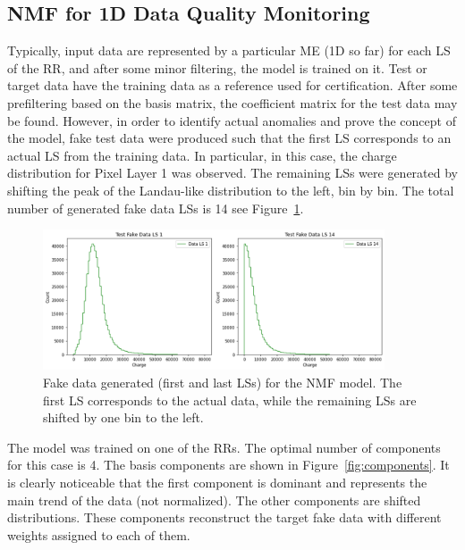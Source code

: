 \subsection{NMF for 1D Data Quality Monitoring}

Typically, input data are represented by a particular ME (1D so far) for each LS of the RR, and after some minor filtering, the model is trained on it. Test or target data have the training data as a reference used for certification. After some prefiltering based on the basis matrix, the coefficient matrix for the test data may be found. However, in order to identify actual anomalies and prove the concept of the model, fake test data were produced such that the first LS corresponds to an actual LS from the training data. In particular, in this case, the charge distribution for Pixel Layer 1 was observed. The remaining LSs were generated by shifting the peak of the Landau-like distribution to the left, bin by bin. The total number of generated fake data LSs is 14 see Figure~\ref{fig:fake_data}.

\begin{figure}[H]
    \centering
    \includegraphics[width=0.9\textwidth]{images/fake_input.png}
    \caption{Fake data generated (first and last LSs) for the NMF model. The first LS corresponds to the actual data, while the remaining LSs are shifted by one bin to the left.}
    \label{fig:fake_data}
\end{figure}

The model was trained on one of the RRs. The optimal number of components for this case is 4. The basis components are shown in Figure~\ref{fig:components}. It is clearly noticeable that the first component is dominant and represents the main trend of the data (not normalized). The other components are shifted distributions. These components reconstruct the target fake data with different weights assigned to each of them.

